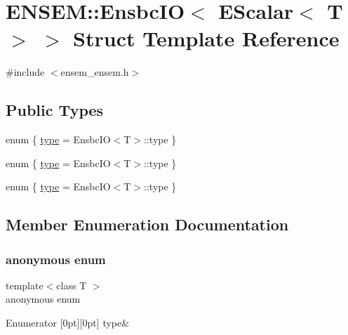 \hypertarget{structENSEM_1_1EnsbcIO_3_01EScalar_3_01T_01_4_01_4}{}\section{E\+N\+S\+EM\+:\+:Ensbc\+IO$<$ E\+Scalar$<$ T $>$ $>$ Struct Template Reference}
\label{structENSEM_1_1EnsbcIO_3_01EScalar_3_01T_01_4_01_4}


{\ttfamily \#include $<$ensem\+\_\+ensem.\+h$>$}

\subsection*{Public Types}
\begin{DoxyCompactItemize}
\item 
enum \{ \mbox{\hyperlink{structENSEM_1_1EnsbcIO_3_01EScalar_3_01T_01_4_01_4_a698bb58bb4e12b6da201a1119e261216a91b43cfd0a234b7ecf01fb42ee56c00b}{type}} = Ensbc\+IO$<$T$>$\+:\+:type
 \}
\item 
enum \{ \mbox{\hyperlink{structENSEM_1_1EnsbcIO_3_01EScalar_3_01T_01_4_01_4_a698bb58bb4e12b6da201a1119e261216a91b43cfd0a234b7ecf01fb42ee56c00b}{type}} = Ensbc\+IO$<$T$>$\+:\+:type
 \}
\item 
enum \{ \mbox{\hyperlink{structENSEM_1_1EnsbcIO_3_01EScalar_3_01T_01_4_01_4_a698bb58bb4e12b6da201a1119e261216a91b43cfd0a234b7ecf01fb42ee56c00b}{type}} = Ensbc\+IO$<$T$>$\+:\+:type
 \}
\end{DoxyCompactItemize}


\subsection{Member Enumeration Documentation}
\mbox{\label{structENSEM_1_1EnsbcIO_3_01EScalar_3_01T_01_4_01_4_a8131f1b4684ee0bbe8708b17a73dcf58}} 
\subsubsection{\texorpdfstring{anonymous enum}{anonymous enum}}
{\footnotesize\ttfamily template$<$class T $>$ \\
anonymous enum}

\begin{DoxyEnumFields}{Enumerator}
[0pt][0pt]{}\mbox{\label{structENSEM_1_1EnsbcIO_3_01EScalar_3_01T_01_4_01_4_a698bb58bb4e12b6da201a1119e261216a91b43cfd0a234b7ecf01fb42ee56c00b}} 
type&\\
\hline

\end{DoxyEnumFields}
\mbox{\label{structENSEM_1_1EnsbcIO_3_01EScalar_3_01T_01_4_01_4_ac646de0b09040fbe5aa03939f2ca71fb}} 
